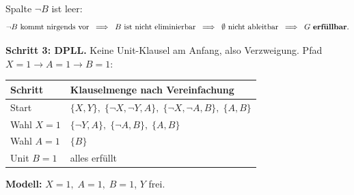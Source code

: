 \documentclass[a4paper,12pt]{article}
\begin{document}
Spalte $\neg B$ ist leer:
\[
\neg B \text{ kommt nirgends vor}
\;\;\Longrightarrow\;\;
B \text{ ist nicht eliminierbar}
\;\;\Longrightarrow\;\;
\emptyset \text{ nicht ableitbar}
\;\;\Longrightarrow\;\;
G \text{ \textbf{erf\"ullbar}}.
\]

\bigskip
\textbf{Schritt 3: DPLL.}
Keine Unit-Klausel am Anfang, also Verzweigung. Pfad $X = 1 \to A = 1 \to B = 1$:

\begin{center}
\renewcommand{\arraystretch}{1.35}
\begin{tabular}{ll}
\toprule
\textbf{Schritt} & \textbf{Klauselmenge nach Vereinfachung} \\
\midrule
Start              & $\{X, Y\},\;\{\neg X, \neg Y, A\},\;\{\neg X, \neg A, B\},\;\{A, B\}$ \\
Wahl $X = 1$       & $\{\neg Y, A\},\;\{\neg A, B\},\;\{A, B\}$ \\
Wahl $A = 1$       & $\{B\}$ \\
Unit $B = 1$       & alles erf\"ullt \\
\bottomrule
\end{tabular}
\end{center}

\textbf{Modell:} $X = 1,\; A = 1,\; B = 1$, $Y$ frei.

\medskip
\noindent{}
\end{document}

